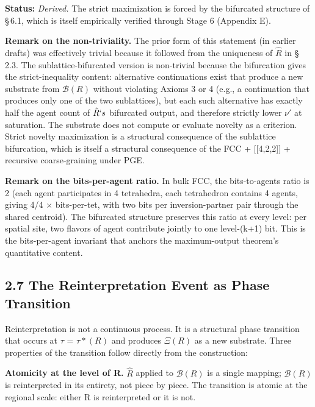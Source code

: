 \documentclass[11pt,oneside]{report}
\theoremstyle{definition}
\theoremstyle{remark}
\begin{document}
\textbf{Status:} \emph{Derived.} The strict maximization is forced by
the bifurcated structure of \S\,6.1, which is itself empirically verified
through Stage 6 (Appendix E).

\textbf{Remark on the non-triviality.} The prior form of this statement
(in earlier drafts) was effectively trivial because it followed from the
uniqueness of \ensuremath{\hat{R}} in \S\,2.3. The sublattice-bifurcated version is
non-trivial because the bifurcation gives the strict-inequality content:
alternative continuations exist that produce a new substrate from \ensuremath{\mathcal{B}(R)}
without violating Axioms 3 or 4 (e.g., a continuation that produces only
one of the two sublattices), but each such alternative has exactly half
the agent count of \ensuremath{\hat{R}`s} bifurcated output, and therefore strictly lower
\ensuremath{\nu '} at saturation. The substrate does not compute or evaluate novelty as
a criterion. Strict novelty maximization is a structural consequence of
the sublattice bifurcation, which is itself a structural consequence of
the FCC + [[4,2,2]] + recursive coarse-graining under PGE.

\textbf{Remark on the bits-per-agent ratio.} In bulk FCC, the
bits-to-agents ratio is 2 (each agent participates in 4 tetrahedra, each
tetrahedron contains 4 agents, giving 4/4 \ensuremath{\times} bits-per-tet, with two bits
per inversion-partner pair through the shared centroid). The bifurcated
structure preserves this ratio at every level: per spatial site, two
flavors of agent contribute jointly to one level-(k+1) bit. This is the
bits-per-agent invariant that anchors the maximum-output theorem's
quantitative content.

\subsection*{2.7 The Reinterpretation Event as Phase Transition}

Reinterpretation is not a continuous process. It is a structural phase
transition that occurs at \ensuremath{\tau} = \ensuremath{\tau *(R)} and produces \ensuremath{\Xi (R)} as a new
substrate. Three properties of the transition follow directly from the
construction:

\textbf{Atomicity at the level of R.} \ensuremath{\hat{R}} applied to \ensuremath{\mathcal{B}(R)} is a single
mapping; \ensuremath{\mathcal{B}(R)} is reinterpreted in its entirety, not piece by piece. The
transition is atomic at the regional scale: either R is reinterpreted or
it is not.
\end{document}
